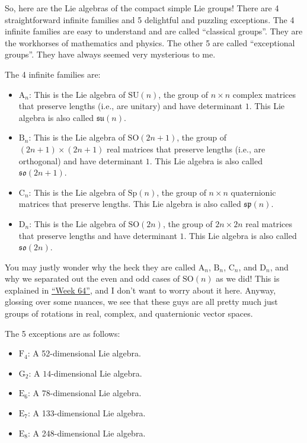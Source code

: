 \documentclass{article}
\def\tightlist{}
\begin{document}
So, here are the Lie algebras of the compact simple Lie groups! There
are 4 straightforward infinite families and 5 delightful and puzzling
exceptions. The 4 infinite families are easy to understand and are
called ``classical groups''. They are the workhorses of mathematics and
physics. The other 5 are called ``exceptional groups''. They have always
seemed very mysterious to me.

The 4 infinite families are:

\begin{itemize}
\tightlist
\item
  \(\mathrm{A}_n\): This is the Lie algebra of \(\mathrm{SU}(n)\), the
  group of \(n\times n\) complex matrices that preserve lengths (i.e.,
  are unitary) and have determinant \(1\). This Lie algebra is also
  called \(\mathfrak{su}(n)\).
\item
  \(\mathrm{B}_n\): This is the Lie algebra of \(\mathrm{SO}(2n+1)\),
  the group of \((2n+1)\times(2n+1)\) real matrices that preserve
  lengths (i.e., are orthogonal) and have determinant \(1\). This Lie
  algebra is also called \(\mathfrak{so}(2n+1)\).
\item
  \(\mathrm{C}_n\): This is the Lie algebra of \(\mathrm{Sp}(n)\), the
  group of \(n\times n\) quaternionic matrices that preserve lengths.
  This Lie algebra is also called \(\mathfrak{sp}(n)\).
\item
  \(\mathrm{D}_n\): This is the Lie algebra of \(\mathrm{SO}(2n)\), the
  group of \(2n\times 2n\) real matrices that preserve lengths and have
  determinant \(1\). This Lie algebra is also called
  \(\mathfrak{so}(2n)\).
\end{itemize}

You may justly wonder why the heck they are called \(\mathrm{A}_n\),
\(\mathrm{B}_n\), \(\mathrm{C}_n\), and \(\mathrm{D}_n\), and why we
separated out the even and odd cases of \(\mathrm{SO}(n)\) as we did!
This is explained in \protect\hyperlink{week64}{``Week 64''}, and I
don't want to worry about it here. Anyway, glossing over some nuances,
we see that these guys are all pretty much just groups of rotations in
real, complex, and quaternionic vector spaces.

The 5 exceptions are as follows:

\begin{itemize}
\tightlist
\item
  \(\mathrm{F}_4\): A 52-dimensional Lie algebra.
\item
  \(\mathrm{G}_2\): A \(14\)-dimensional Lie algebra.
\item
  \(\mathrm{E}_6\): A 78-dimensional Lie algebra.
\item
  \(\mathrm{E}_7\): A 133-dimensional Lie algebra.
\item
  \(\mathrm{E}_8\): A 248-dimensional Lie algebra.
\end{itemize}
\end{document}
